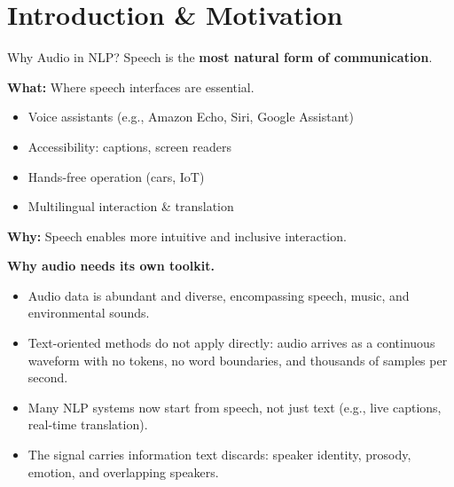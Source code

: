 \section{Introduction \& Motivation}

\begin{frame}[allowframebreaks]{Why Audio in NLP?}
  \large{Speech is the \textbf{most natural form of communication}.}

  \vspace{0.5em}

  \normalsize
  \textbf{What:} Where speech interfaces are essential.
  \begin{itemize}
    \item Voice assistants (e.g., Amazon Echo, Siri, Google Assistant)
    \item Accessibility: captions, screen readers
    \item Hands-free operation (cars, IoT)
    \item Multilingual interaction \& translation
  \end{itemize}
  \vspace{0.5em}
  \textbf{Why:} Speech enables more intuitive and inclusive interaction.

\framebreak

  \textbf{Why audio needs its own toolkit.}
  \begin{itemize}
    \setlength{\itemsep}{1em}
    \item Audio data is abundant and diverse, encompassing speech, music, and environmental sounds.
    \item Text-oriented methods do not apply directly: audio arrives as a continuous waveform with no tokens, no word boundaries, and thousands of samples per second.
    \item Many NLP systems now start from speech, not just text (e.g., live captions, real-time translation).
    \item The signal carries information text discards: speaker identity, prosody, emotion, and overlapping speakers.
  \end{itemize}
\end{frame}
